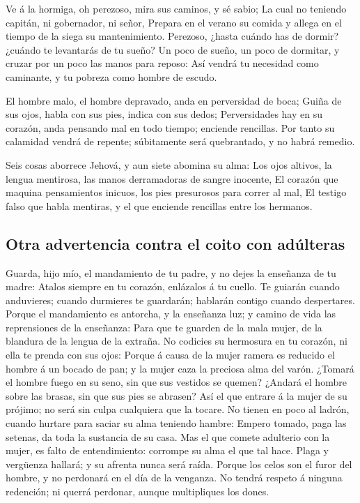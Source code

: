  Ve á la hormiga, oh perezoso, mira sus caminos, y sé
sabio;  La cual no teniendo capitán, ni gobernador, ni
señor,  Prepara en el verano su comida y allega en el
tiempo de la siega su mantenimiento.  Perezoso, ¿hasta
cuándo has de dormir? ¿cuándo te levantarás de tu sueño? 
Un poco de sueño, un poco de dormitar, y cruzar por un poco las manos
para reposo:  Así vendrá tu necesidad como caminante, y
tu pobreza como hombre de escudo.

 El hombre malo, el hombre depravado, anda en perversidad
de boca;  Guiña de sus ojos, habla con sus pies, indica
con sus dedos;  Perversidades hay en su corazón, anda
pensando mal en todo tiempo; enciende rencillas.  Por
tanto su calamidad vendrá de repente; súbitamente será quebrantado, y no
habrá remedio.

 Seis cosas aborrece Jehová, y aun siete abomina su alma:
 Los ojos altivos, la lengua mentirosa, las manos
derramadoras de sangre inocente,  El corazón que maquina
pensamientos inicuos, los pies presurosos para correr al mal,
 El testigo falso que habla mentiras, y el que enciende
rencillas entre los hermanos.

\hypertarget{otra-advertencia-contra-el-coito-con-aduxfalteras}{%
\subsection{Otra advertencia contra el coito con
adúlteras}\label{otra-advertencia-contra-el-coito-con-aduxfalteras}}

 Guarda, hijo mío, el mandamiento de tu padre, y no dejes
la enseñanza de tu madre:  Atalos siempre en tu corazón,
enlázalos á tu cuello.  Te guiarán cuando anduvieres;
cuando durmieres te guardarán; hablarán contigo cuando despertares.
 Porque el mandamiento es antorcha, y la enseñanza luz; y
camino de vida las reprensiones de la enseñanza:  Para
que te guarden de la mala mujer, de la blandura de la lengua de la
extraña.  No codicies su hermosura en tu corazón, ni ella
te prenda con sus ojos:  Porque á causa de la mujer
ramera es reducido el hombre á un bocado de pan; y la mujer caza la
preciosa alma del varón.  ¿Tomará el hombre fuego en su
seno, sin que sus vestidos se quemen?  ¿Andará el hombre
sobre las brasas, sin que sus pies se abrasen?  Así el
que entrare á la mujer de su prójimo; no será sin culpa cualquiera que
la tocare.  No tienen en poco al ladrón, cuando hurtare
para saciar su alma teniendo hambre:  Empero tomado, paga
las setenas, da toda la sustancia de su casa.  Mas el que
comete adulterio con la mujer, es falto de entendimiento: corrompe su
alma el que tal hace.  Plaga y vergüenza hallará; y su
afrenta nunca será raída.  Porque los celos son el furor
del hombre, y no perdonará en el día de la venganza.  No
tendrá respeto á ninguna redención; ni querrá perdonar, aunque
multipliques los dones.

